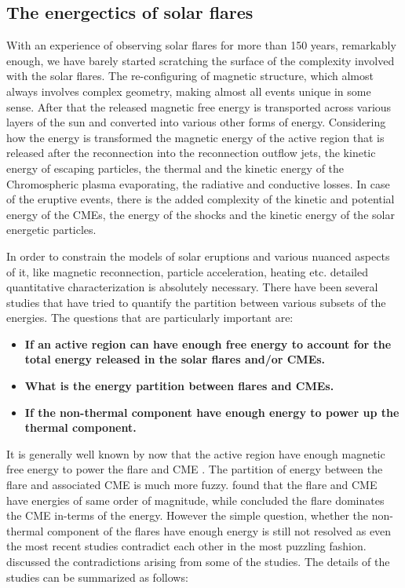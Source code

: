 \subsection{The energectics of solar flares}\label{sol_flr_energ}

With an experience of observing solar flares for more than 150 years, remarkably enough, we have barely started scratching the surface of the complexity involved with the solar flares. The re-configuring of magnetic structure, which almost always involves complex geometry, making almost all events unique in some sense. After that the released magnetic free energy is transported across various layers of the sun and converted into various other forms of energy. Considering how the energy is transformed the magnetic energy of the active region that is released after the reconnection into the reconnection outflow jets, the kinetic energy of escaping particles, the thermal and the kinetic energy of the Chromospheric plasma evaporating, the radiative and conductive losses. In case of the eruptive events, there is the added complexity of the kinetic and potential energy of the CMEs, the energy of the shocks and the kinetic energy of the solar energetic particles. 

In order to constrain the models of solar eruptions and various nuanced aspects of it, like magnetic reconnection, particle acceleration, heating etc. detailed quantitative characterization is absolutely necessary. There have been several studies that have tried to quantify the partition between various subsets of the energies. The questions that are particularly important are:

\begin{itemize}
    \item \textbf{If an active region can have enough free energy to account for the total energy released in the solar flares and/or CMEs.}
    \item \textbf{What is the energy partition between flares and CMEs.}
    \item \textbf{If the non-thermal component have enough energy to power up the thermal component.}
\end{itemize}

It is generally well known by now that the active region have enough magnetic free energy to power the flare and CME \citep{emslie12,ash17}. The partition of energy between the flare and associated CME is much more fuzzy. \cite{emslie12} found that the flare and CME have energies of same order of magnitude, while \cite{ash17} concluded the flare dominates the CME in-terms of the energy. However the simple question, whether the non-thermal component of the flares have enough energy is still not resolved as even the most recent studies contradict each other in the most puzzling fashion. \cite{warmuth20} discussed the contradictions arising from some of the studies\citep{stosire07,emslie12,inglis14,warmuth16a,warmuth16b,ash17}. The details of the studies can be summarized as follows:

